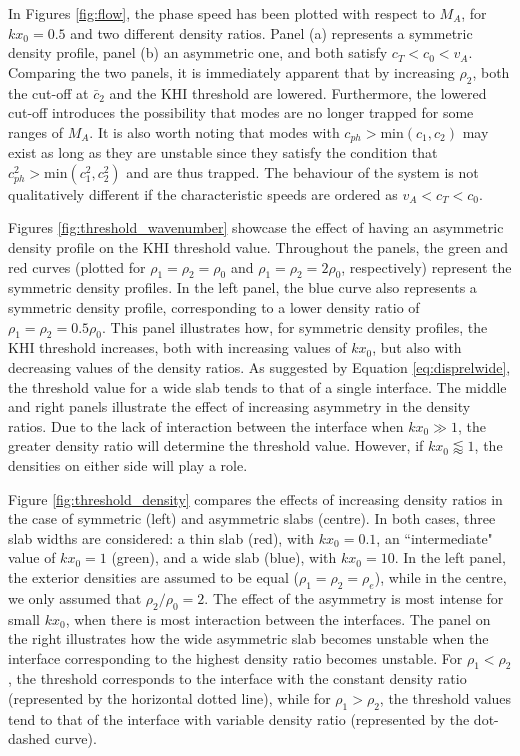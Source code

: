 In Figures \ref{fig:flow}, the phase speed has been plotted with respect to $M_A$, for $k x_0 = 0.5$ and two different density ratios.
Panel (a) represents a symmetric density profile, panel (b) an asymmetric one, and both satisfy $c_T < c_0 < v_A$.
Comparing the two panels, it is immediately apparent that by increasing $\rho_2$, both the cut-off at $\bar c_2$ and the KHI threshold are lowered.
Furthermore, the lowered cut-off introduces the possibility that modes are no longer trapped for some ranges of $M_A$.
It is also worth noting that modes with $c_{ph} > \textrm{min}(c_1, c_2)$ may exist as long as they are unstable since they satisfy the condition that $c_{ph}^2 > \textrm{min}(c_1^2, c_2^2)$ and are thus trapped.
The behaviour of the system is not qualitatively different if the characteristic speeds are ordered as $v_A < c_T < c_0$.

Figures \ref{fig:threshold_wavenumber} showcase the effect of having an asymmetric density profile on the KHI threshold value.
Throughout the panels, the green and red curves (plotted for $\rho_1 = \rho_2 =  \rho_0$ and $\rho_1 = \rho_2 = 2 \rho_0$, respectively) represent the symmetric density profiles.
In the left panel, the blue curve also represents a symmetric density profile, corresponding to a lower density ratio of $\rho_1 = \rho_2 = 0.5 \rho_0$.
This panel illustrates how, for symmetric density profiles, the KHI threshold increases, both with increasing values of $k x_0$, but also with decreasing values of the density ratios.
As suggested by Equation \eqref{eq:disprelwide}, the threshold value for a wide slab tends to that of a single interface.
The middle and right panels illustrate the effect of increasing asymmetry in the density ratios.
Due to the lack of interaction between the interface when $k x_0 \gg 1$, the greater density ratio will determine the threshold value. However, if $k x_0 \lessapprox 1$, the densities on either side will play a role.

Figure \ref{fig:threshold_density} compares the effects of increasing density ratios in the case of symmetric (left) and asymmetric slabs (centre).
In both cases, three slab widths are considered: a thin slab (red), with $k x_0 = 0.1$, an ``intermediate" value of $k x_0 = 1$ (green), and a wide slab (blue), with $k x_0 = 10$.
In the left panel, the exterior densities are assumed to be equal ($\rho_1 = \rho_2 = \rho_e$), while in the centre, we only assumed that $\rho_2/\rho_0 = 2$. 
The effect of the asymmetry is most intense for small $k x_0$, when there is most interaction between the interfaces.
The panel on the right illustrates how the wide asymmetric slab becomes unstable when the interface corresponding to the highest density ratio becomes unstable.
For $\rho_1 < \rho_2$, the threshold corresponds to the interface with the constant density ratio (represented by the horizontal dotted line), while for $\rho_1 > \rho_2$, the threshold values tend to that of the interface with variable density ratio (represented by the dot-dashed curve).

